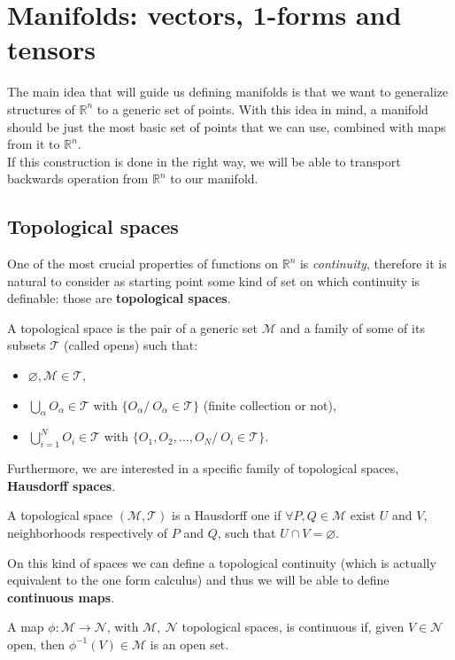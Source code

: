 \section{Manifolds: vectors, 1-forms and tensors}
The main idea that will guide us defining manifolds is that we want to generalize structures of $\mathbb{R}^n$ to a generic set of points. With this idea in mind, a manifold should be just the most basic set of points that we can use, combined with maps from it to $\mathbb{R}^n$.\\ If this construction is done in the right way, we will be able to transport backwards operation from $\mathbb{R}^n$ to our manifold.
\subsection{Topological spaces}
One of the most crucial properties of functions on $\mathbb{R}^n$ is \emph{continuity}, therefore it is natural to consider as starting point some kind of set on which continuity is definable: those are \textbf{topological spaces}. 
\begin{defin}
	A topological space is the pair of a generic set $\mathcal{M}$ and a family of some of its subsets $\mathcal{T}$ (called opens) such that:
    \begin{itemize}
	       \item $\varnothing,\mathcal{M} \in \mathcal{T}$,
	       \item $\bigcup_\alpha O_\alpha\in\mathcal{T}$ with $\{O_\alpha/\  O_\alpha \in\mathcal{T}\}$ (finite collection or not),
	       \item $\bigcup_{i=1}^N O_i\in\mathcal{T}$ with $\{O_1,O_2,...,O_N /\ O_i \in\mathcal{T}\}$.
    \end{itemize}
\end{defin}
Furthermore, we are interested in a specific family of topological spaces, \textbf{Hausdorff spaces}.
\begin{defin}
	A topological space $(\mathcal{M},\mathcal{T} )$ is a Hausdorff one if $\forall P,Q\in\mathcal{M}$ exist $U$ and $V$, neighborhoods respectively of $P$ and $Q$, such that $U\cap V=\varnothing$. 
\end{defin}
On this kind of spaces we can define a topological continuity (which is actually equivalent to the one form calculus) and thus we will be able to define \textbf{continuous maps}.
\begin{defin}
A map $\phi:\mathcal{M}\rightarrow\mathcal{N} $, with $\mathcal{M},\ \mathcal{N} $ topological spaces, is continuous if, given $V\in\mathcal{N}$ open, then $\phi^{-1}(V)\in\mathcal{M}$ is an open set.
\end{defin}
